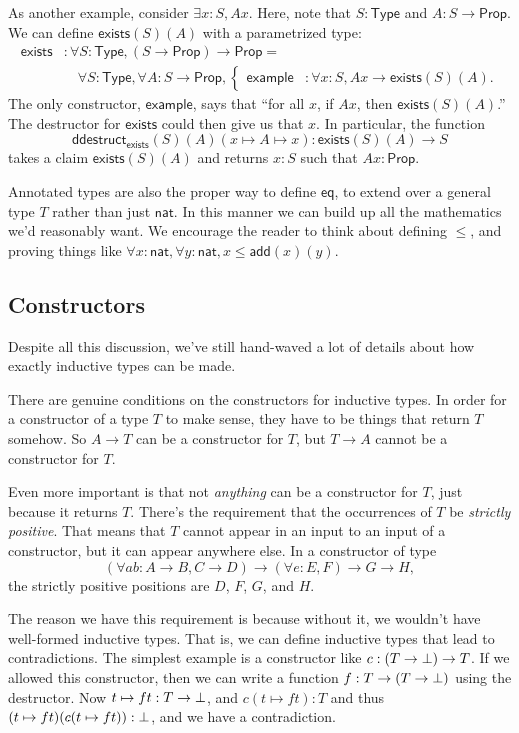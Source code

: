 \documentclass[11pt,paper=letter]{scrartcl}
\renewcommand{\sf}{\mathsf}
\newcommand{\prop}{\mathsf{Prop}}
\newcommand{\type}{\mathsf{Type}}
\begin{document}
As another example, consider $\exists x: S, Ax$. Here, note that $S: \type$ and $A : S \to \prop$. We can define $\sf{exists}(S)(A)$ with a parametrized type:
\begin{align*}
\sf{exists}&: \forall S: \type, (S \to \prop) \to \prop =\\
&\quad\!\forall S: \type, \forall A:S \to \prop, \begin{cases}
  \sf{example}&: \forall x: S, Ax \to \sf{exists}(S)(A).
\end{cases}
\end{align*}
The only constructor, $\sf{example}$, says that ``for all $x$, if $Ax$, then $\sf{exists}(S)(A)$.'' The destructor for $\sf{exists}$ could then give us that $x$. In particular, the function \[
  \sf{ddestruct}_\sf{exists}(S)(A)(x \mapsto A \mapsto x) : \sf{exists}(S)(A) \to S
\]
takes a claim $\sf{exists}(S)(A)$ and returns $x : S$ such that $Ax : \prop$.

Annotated types are also the proper way to define $\sf{eq}$, to extend over a general type $T$ rather than just $\sf{nat}$. In this manner we can build up all the mathematics we'd reasonably want. We encourage the reader to think about defining $\le$, and proving things like $\forall x: \sf{nat}, \forall y: \sf{nat}, x \le \sf{add}(x)(y)$.

\subsection{Constructors}

Despite all this discussion, we've still hand-waved a lot of details about how exactly inductive types can be made.

There are genuine conditions on the constructors for inductive types. In order for a constructor of a type $T$ to make sense, they have to be things that return $T$ somehow. So $A \to T$ can be a constructor for $T$, but $T \to A$ cannot be a constructor for $T$.

Even more important is that not \emph{anything} can be a constructor for $T$, just because it returns $T$. There's the requirement that the occurrences of $T$ be \emph{strictly positive}. That means that $T$ cannot appear in an input to an input of a constructor, but it can appear anywhere else. In a constructor of type \[
\left(\forall ab: A \to B, C \to D\right) \to (\forall e: E, F) \to G \to H,
\]
the strictly positive positions are $D$, $F$, $G$, and $H$.

The reason we have this requirement is because without it, we wouldn't have well-formed inductive types. That is, we can define inductive types that lead to contradictions. The simplest example is a constructor like $c: (T \to \bot) \to T$. If we allowed this constructor, then we can write a function $f : T \to (T \to \bot)$ using the destructor. Now $t \mapsto ft : T \to \bot$, and $c(t \mapsto ft) : T$ and thus $(t \mapsto ft)(c(t \mapsto ft)) : \bot$, and we have a contradiction.
\end{document}
